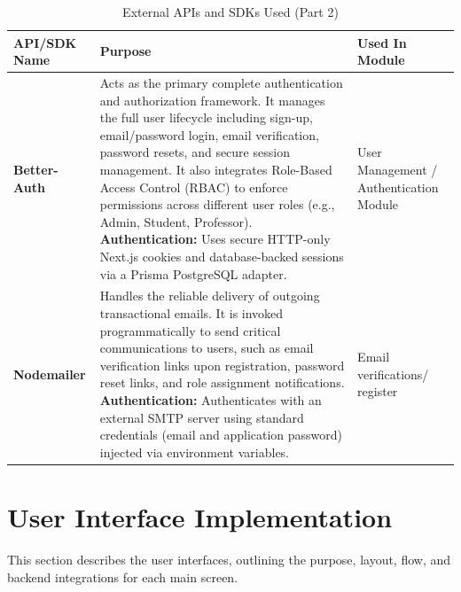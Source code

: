 \begin{table}[H]
    \centering
    \renewcommand{\arraystretch}{1.5}
    \begin{tabular}{|p{3cm}|p{8cm}|p{4cm}|}
        \hline
        \textbf{API/SDK Name} & \textbf{Purpose} & \textbf{Used In Module} \\
        \hline
        \textbf{Better-Auth} &
        Acts as the primary complete authentication and authorization framework. It manages the full user lifecycle including sign-up, email/password login, email verification, password resets, and secure session management. It also integrates Role-Based Access Control (RBAC) to enforce permissions across different user roles (e.g., Admin, Student, Professor). \newline
        \textbf{Authentication:} Uses secure HTTP-only Next.js cookies and database-backed sessions via a Prisma PostgreSQL adapter. &
        User Management / Authentication Module \\
        \hline
        \textbf{Nodemailer} &
        Handles the reliable delivery of outgoing transactional emails. It is invoked programmatically to send critical communications to users, such as email verification links upon registration, password reset links, and role assignment notifications. \newline
        \textbf{Authentication:} Authenticates with an external SMTP server using standard credentials (email and application password) injected via environment variables. &
        Email verifications/ register \\
        \hline
    \end{tabular}
    \caption{External APIs and SDKs Used (Part 2)}
    \label{tab:external_apis_2}
\end{table}



\section{User Interface Implementation}

This section describes the user interfaces, outlining the purpose, layout, flow, and backend integrations for each main screen.


